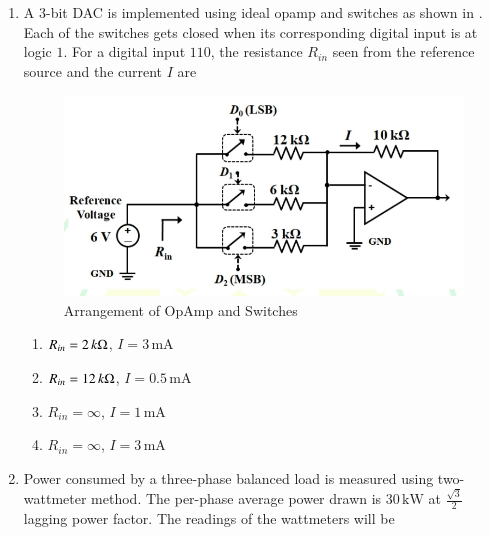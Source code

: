 \documentclass[journal,12pt,onecolumn]{IEEEtran}
\theoremstyle{remark}
\begin{document}
\begin{enumerate}
\item A $3$-bit DAC is implemented using ideal opamp and switches as shown in . Each of the switches gets closed when its corresponding digital input is at logic $1$. For a digital input $110$, the resistance $R_{in}$ seen from the reference source and the current $I$ are \par\hfill{}
\begin{figure}[H]
\centering
\includegraphics[width=0.6\columnwidth]{Figs/Q-43.jpg}
\caption{Arrangement of OpAmp and Switches}
\label{43}
\end{figure}
\begin{enumerate}
\item $R_{in}=2\,k\ohm$, $I=3\,\text{mA}$
\item $R_{in}=12\,k\ohm$, $I=0.5\,\text{mA}$
\item $R_{in} = \infty$, $I=1\,\text{mA}$
\item $R_{in} = \infty$, $I=3\,\text{mA}$
\end{enumerate}


\item Power consumed by a three-phase balanced load is measured using two-wattmeter method. The per-phase average power drawn is $30\,\text{kW}$ at $\frac{\sqrt{3}}{2}$ lagging power factor. The readings of the wattmeters will be \par\hfill{}
\begin{enumerate}
\end{enumerate}



\end{enumerate}
\end{document}
